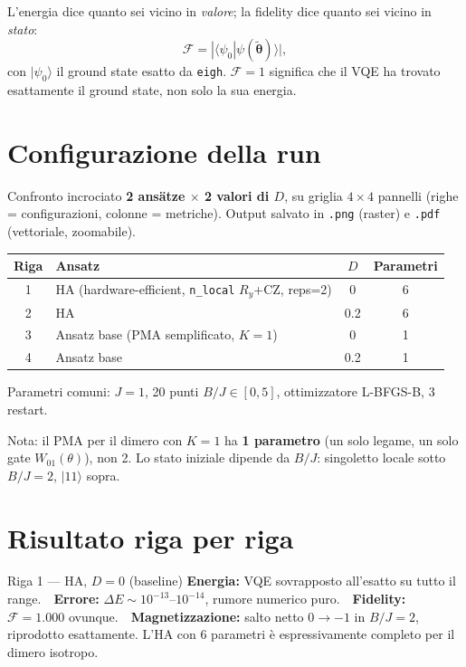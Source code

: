 \documentclass[11pt,a4paper]{article}
\begin{document}
L'energia dice quanto sei vicino in \emph{valore}; la fidelity dice
quanto sei vicino in \emph{stato}:
$$\mathcal F = |\langle\psi_0|\psi(\tilde{\boldsymbol\theta})\rangle|,$$
con $|\psi_0\rangle$ il ground state esatto da \texttt{eigh}.
$\mathcal F=1$ significa che il VQE ha trovato esattamente il ground
state, non solo la sua energia.

\section*{Configurazione della run}

Confronto incrociato \textbf{2 ansätze $\times$ 2 valori di $D$}, su
griglia $4\times4$ pannelli (righe = configurazioni, colonne =
metriche). Output salvato in \texttt{.png} (raster) e \texttt{.pdf}
(vettoriale, zoomabile).

\begin{center}
\renewcommand{\arraystretch}{1.25}
\begin{tabular}{@{}cp{5.3cm}cc@{}}
\toprule
\rowcolor{inkblue!10}
\textbf{Riga} & \textbf{Ansatz} & \textbf{$D$} & \textbf{Parametri}\\
\midrule
1 & HA (hardware-efficient, \texttt{n\_local} $R_y$+CZ, reps=2) & 0 & 6\\
2 & HA & 0.2 & 6\\
3 & Ansatz base (PMA semplificato, $K=1$) & 0 & 1\\
4 & Ansatz base & 0.2 & 1\\
\bottomrule
\end{tabular}
\end{center}

Parametri comuni: $J=1$, 20 punti $B/J\in[0,5]$, ottimizzatore
L-BFGS-B, 3 restart.

\begin{keyeq}
\small
Nota: il PMA per il dimero con $K=1$ ha \textbf{1 parametro} (un solo
legame, un solo gate $W_{01}(\theta)$), non 2. Lo stato iniziale dipende
da $B/J$: singoletto locale sotto $B/J=2$, $|11\rangle$ sopra.
\end{keyeq}

\section*{Risultato riga per riga}

\begin{okbox}{Riga 1 --- HA, $D=0$ (baseline)}
\textbf{Energia:} VQE sovrapposto all'esatto su tutto il range.\ \
\textbf{Errore:} $\Delta E\sim10^{-13}$--$10^{-14}$, rumore numerico
puro.\ \ \textbf{Fidelity:} $\mathcal F=1.000$ ovunque.\ \
\textbf{Magnetizzazione:} salto netto $0\to-1$ in $B/J=2$, riprodotto
esattamente. L'HA con 6 parametri è espressivamente completo per il
dimero isotropo.
\end{okbox}
\smallskip
\end{document}
